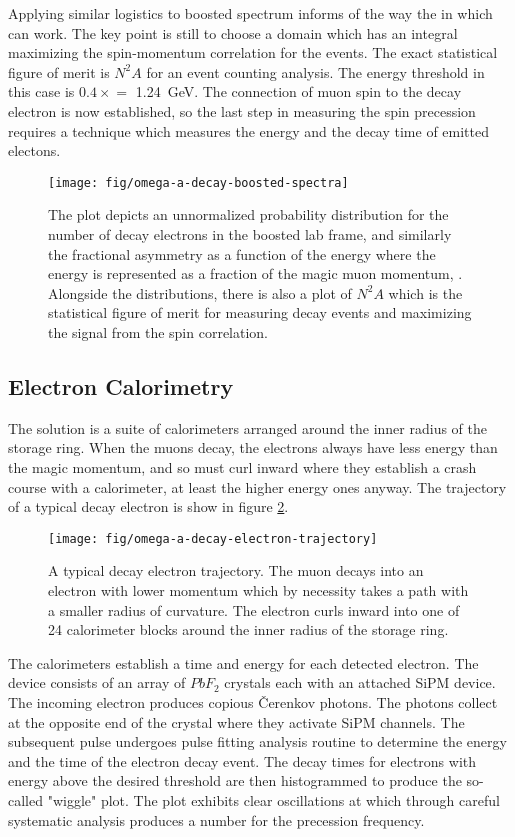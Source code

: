 Applying similar logistics to boosted spectrum informs of the way the in which \gmtwo can work.  The key point is still to choose a domain which has an integral maximizing the spin-momentum correlation for the events.  The exact statistical figure of merit is $N^2A$ for an event counting analysis.  The energy threshold in this case is $0.4\times$\pmagic$ = $ \SI{1.24}{\GeV}.  The connection of muon spin to the decay electron is now established, so the last step in measuring the spin precession requires a technique which measures the energy and the decay time of emitted electons. \cite{e821-prd}

\begin{figure}
\label{fig:omega-a-decay-boosted-spectra}
\texttt{[image: fig/omega-a-decay-boosted-spectra]}
\caption{The plot depicts an unnormalized probability distribution for the number of decay electrons in the boosted lab frame, and similarly the fractional asymmetry as a function of the energy where the energy is represented as a fraction of the magic muon momentum, \pmagic. Alongside the distributions, there is also a plot of $N^2A$ which is the statistical figure of merit for measuring decay events and maximizing the signal from the spin correlation.}
\end{figure}

\subsection{Electron Calorimetry}

The solution is a suite of calorimeters arranged around the inner radius of the storage ring.  When the muons decay, the electrons always have less energy than the magic momentum, and so must curl inward where they establish a crash course with a calorimeter, at least the higher energy ones anyway. The trajectory of a typical decay electron is show in figure \ref{fig:omega-a-decay-electron-trajectory}.

\begin{figure}
\label{fig:omega-a-decay-electron-trajectory}
\texttt{[image: fig/omega-a-decay-electron-trajectory]}
\caption{A typical decay electron trajectory.  The muon decays into an electron with lower momentum which by necessity takes a path with a smaller radius of curvature.  The electron curls inward into one of 24 calorimeter blocks around the inner radius of the storage ring.}
\end{figure}

The calorimeters establish a time and energy for each detected electron.  The device consists of an array of $PbF_2$ crystals each with an attached SiPM device.  The incoming electron produces copious \v{C}erenkov photons.  The photons collect at the opposite end of the crystal where they activate SiPM channels.  The subsequent pulse undergoes pulse fitting analysis routine to determine the energy and the time of the electron decay event.  The decay times for electrons with energy above the desired threshold are then histogrammed to produce the so-called "wiggle" plot.  The plot exhibits clear oscillations at \wa which through careful systematic analysis produces a number for the precession frequency.

